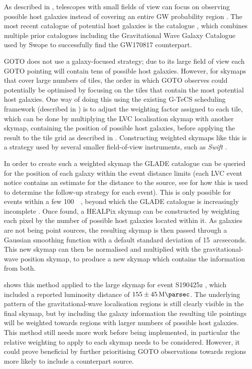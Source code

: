 \begin{colsection}

As described in , telescopes with small fields of view can focus on observing possible host galaxies instead of covering an entire GW probability region \citep{GW_weighting}. The most recent catalogue of potential host galaxies is the  catalogue \citep{GLADE}, which combines multiple prior catalogues including the Gravitational Wave Galaxy Catalogue \citep[GWGC,][]{GWGC} used by Swope to successfully find the GW170817 counterpart.

GOTO does not use a galaxy-focused strategy; due to its large field of view each GOTO pointing will contain tens of possible host galaxies. However, for skymaps that cover large numbers of tiles, the order in which GOTO observes could potentially be optimised by focusing on the tiles that contain the most potential host galaxies. One way of doing this using the existing G-TeCS scheduling framework (described in ) is to adjust the weighting factor assigned to each tile, which can be done by multiplying the LVC localisation skymap with another skymap, containing the position of possible host galaxies, before applying the result to the tile grid as described in . Constructing weighted skymaps like this is a strategy used by several smaller field-of-view instruments, such as \textit{Swift} \citep{GW_Swift}.

In order to create such a weighted skymap the GLADE catalogue can be queried for the position of each galaxy within the event distance limits (each LVC event notice contains an estimate for the distance to the source, see  for how this is used to determine the follow-up strategy for each event). This is only possible for events within a few \SI{100}{\mega\parsec}, beyond which the GLADE catalogue is increasingly incomplete \citep{GLADE}. Once found, a HEALPix skymap can be constructed by weighting each pixel by the number of possible host galaxies located within it. As galaxies are not being point sources, the resulting skymap is then passed through a Gaussian smoothing function with a default standard deviation of 15~arcseconds. This new skymap can then be normalised and multiplied with the gravitational-wave position skymap, to produce a new skymap which contains the information from both.

 shows this method applied to the large skymap for event S190425z \citep{S190425z}, which included a reported luminosity distance of $155\pm\SI{45}{\mega\parsec}$. The underlying pattern of the gravitational-wave localisation regions is still clearly visible in the final skymap, but by including the galaxy information the resulting tile pointings will be weighted towards regions with larger numbers of possible host galaxies. This method still needs more work before being implemented, in particular the relative weighting to apply to each skymap needs to be considered. However, it could prove beneficial by further prioritising GOTO observations towards regions more likely to include a counterpart source.


\end{colsection}
